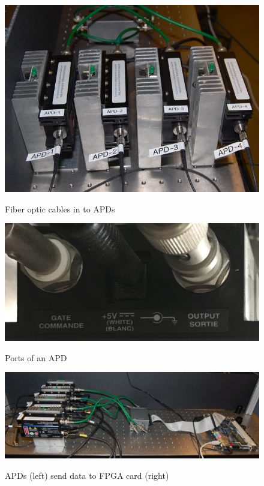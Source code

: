 \documentclass{../lab}
\begin{document}
\begin{figure}[H]
  \href{http://experimentationlab.berkeley.edu/sites/default/files/images/QIE3.jpg}{\includegraphics[width=\linewidth,keepaspectratio]{images/QIE3.jpg}}
  \caption{Fiber optic cables in to APDs}
  \label{fig:QIE3.jpg}
\endminipage\hfill
{}
  \href{http://experimentationlab.berkeley.edu/sites/default/files/images/QIE_Port.jpg}{\includegraphics[width=\linewidth,keepaspectratio]{images/QIE_Port.jpg}}
  \caption{Ports of an APD}
  \label{fig:QIE_Port.jpg}
\endminipage
\end{figure}
\begin{figure}[H]
    \centering
    \href{http://experimentationlab.berkeley.edu/sites/default/files/images/QIE2.jpg}{\includegraphics[width=0.5\linewidth,keepaspectratio]{images/QIE2.jpg}}
    \caption{APDs (left) send data to FPGA card (right)}
    \label{fig:QIE2.jpg}
\end{figure}
\end{document}
